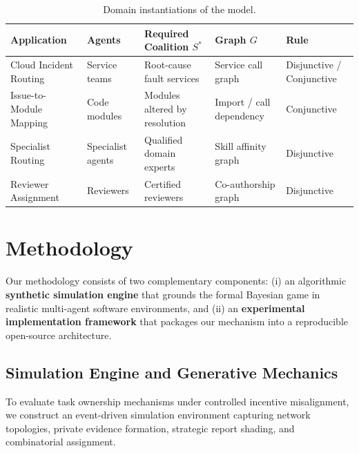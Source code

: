 \documentclass{article}
\theoremstyle{definition}
\begin{document}
\begin{table}[H]
\centering
\small
\caption{Domain instantiations of the model.}
\label{tab:instantiations}
\begin{tabular}{lllll}
\toprule
\textbf{Application} & \textbf{Agents} & \textbf{Required Coalition $S^*$} & \textbf{Graph $G$} & \textbf{Rule} \\
\midrule
Cloud Incident Routing & Service teams & Root-cause fault services & Service call graph & Disjunctive / Conjunctive \\
Issue-to-Module Mapping & Code modules & Modules altered by resolution & Import / call dependency & Conjunctive \\
Specialist Routing & Specialist agents & Qualified domain experts & Skill affinity graph & Disjunctive \\
Reviewer Assignment & Reviewers & Certified reviewers & Co-authorship graph & Disjunctive \\
\bottomrule
\end{tabular}
\end{table}

\section{Methodology}
\label{sec:methodology}

Our methodology consists of two complementary components: (i) an algorithmic \textbf{synthetic simulation engine} that grounds the formal Bayesian game in realistic multi-agent software environments, and (ii) an \textbf{experimental implementation framework} that packages our mechanism into a reproducible open-source architecture.

\subsection{Simulation Engine and Generative Mechanics}
\label{subsec:simulation_engine}

To evaluate task ownership mechanisms under controlled incentive misalignment, we construct an event-driven simulation environment capturing network topologies, private evidence formation, strategic report shading, and combinatorial assignment.
\end{document}
